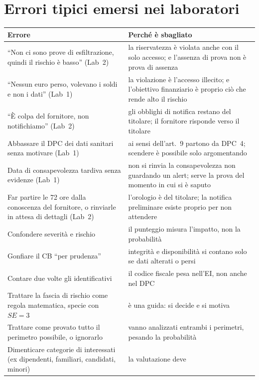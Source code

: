 \section{Errori tipici emersi nei laboratori}
\label{sec:breach-errori}

\begingroup\small
\begin{longtable}{>{\raggedright\arraybackslash}p{6.4cm} >{\raggedright\arraybackslash}p{7.8cm}}
\toprule
\textbf{Errore} & \textbf{Perché è sbagliato}\\
\midrule
\endhead
``Non ci sono prove di esfiltrazione, quindi il rischio è basso'' (Lab~2) & la riservatezza è violata
  anche con il solo accesso; e l'assenza di prova non è prova di assenza\\
``Nessun euro perso, volevano i soldi e non i dati'' (Lab~1) & la violazione è l'accesso illecito; e
  l'obiettivo finanziario è proprio ciò che rende alto il rischio\\
``È colpa del fornitore, non notifichiamo'' (Lab~2) & gli obblighi di notifica restano del titolare; il
  fornitore risponde verso il titolare\\
Abbassare il DPC dei dati sanitari senza motivare (Lab~1) & ai sensi dell'art.~9 partono da DPC~4;
  scendere è possibile solo argomentando\\
Data di consapevolezza tardiva senza evidenze (Lab~1) & non si rinvia la consapevolezza non guardando
  un alert; serve la prova del momento in cui si è saputo\\
Far partire le 72 ore dalla conoscenza del fornitore, o rinviarle in attesa di dettagli (Lab~2) &
  l'orologio è del titolare; la notifica preliminare esiste proprio per non attendere\\
Confondere severità e rischio & il punteggio misura l'impatto, non la probabilità\\
Gonfiare il CB ``per prudenza'' & integrità e disponibilità si contano solo se dati alterati o persi\\
Contare due volte gli identificativi & il codice fiscale pesa nell'EI, non anche nel DPC\\
Trattare la fascia di rischio come regola matematica, specie con $SE = 3$ & è una guida: si decide e si
  motiva\\
Trattare come provato tutto il perimetro possibile, o ignorarlo & vanno analizzati entrambi i perimetri,
  pesando la probabilità\\
Dimenticare categorie di interessati (ex dipendenti, familiari, candidati, minori) & la valutazione deve

\end{longtable}
